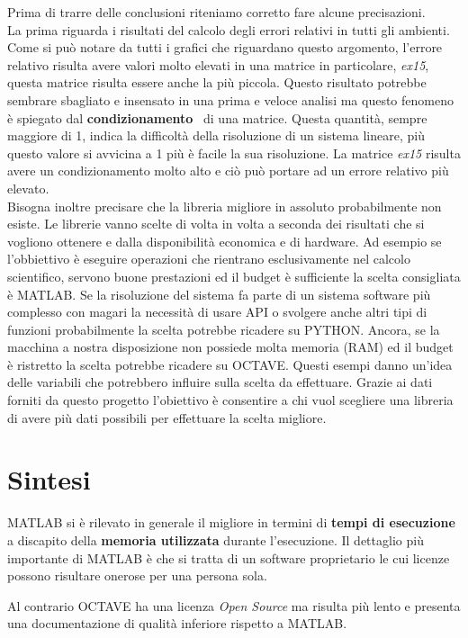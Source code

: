 \documentclass[a4paper,12pt,titlepage,oneside]{book}
\begin{document}
\noindent Prima di trarre delle conclusioni riteniamo corretto fare alcune precisazioni.\\
La prima riguarda i risultati del calcolo degli errori relativi in tutti gli ambienti. Come si può notare da tutti i grafici che riguardano questo argomento, l'errore relativo risulta avere valori molto elevati in una matrice in particolare, \textit{ex15}, questa matrice risulta essere anche la più piccola. Questo risultato potrebbe sembrare sbagliato e insensato in una prima e veloce analisi ma questo fenomeno è spiegato dal \textbf{condizionamento}~\cite{cond} di una matrice. Questa quantità, sempre maggiore di 1, indica la difficoltà della risoluzione di un sistema lineare, più questo valore si avvicina a 1 più è facile la sua risoluzione. La matrice \textit{ex15} risulta avere un condizionamento molto alto e ciò può portare ad un errore relativo più elevato.\\
Bisogna inoltre precisare che la libreria migliore in assoluto probabilmente non esiste. Le librerie vanno scelte di volta in volta a seconda dei risultati che si vogliono ottenere e dalla disponibilità economica e di hardware. Ad esempio se l'obbiettivo è eseguire operazioni che rientrano esclusivamente nel calcolo scientifico, servono buone prestazioni ed il budget è sufficiente la scelta consigliata è MATLAB. Se la risoluzione del sistema fa parte di un sistema software più complesso con magari la necessità di usare API o svolgere anche altri tipi di funzioni probabilmente la scelta potrebbe ricadere su PYTHON. Ancora, se la macchina a nostra disposizione non possiede molta memoria (RAM) ed il budget è ristretto la scelta potrebbe ricadere su OCTAVE. Questi esempi danno un'idea delle variabili che potrebbero influire sulla scelta da effettuare. Grazie ai dati forniti da questo progetto l'obiettivo è consentire a chi vuol scegliere una libreria di avere più dati possibili per effettuare la scelta migliore.
    
    \newpage
    \section{Sintesi}
    MATLAB si è rilevato in generale il migliore in termini di \textbf{tempi di esecuzione} a discapito della \textbf{memoria utilizzata} durante l'esecuzione.
    Il dettaglio più importante di MATLAB è che si tratta di un software proprietario le cui licenze possono risultare onerose per una persona sola.
    
    Al contrario OCTAVE ha una licenza \textit{Open Source}  ma risulta più lento e presenta una documentazione di qualità inferiore rispetto a MATLAB.
    
\end{document}
